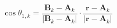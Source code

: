 \documentclass[border=2pt,varwidth]{standalone}
\begin{document}
\[
  \cos \theta_{1,k} =
  \frac{\mathbf{B}_k - \mathbf{A}_k}
       {\left | \mathbf{B}_k - \mathbf{A}_k \right |}
  \cdot
  \frac{\mathbf{r} - \mathbf{A}_k}
       {\left | \mathbf{r} - \mathbf{A}_k \right |}
\]
\end{document}
